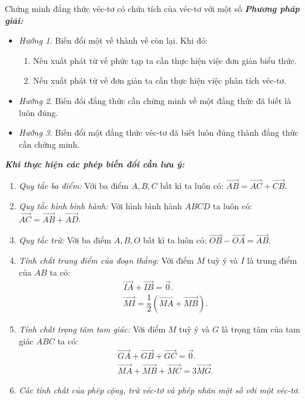 \begin{dang}%
{Chứng minh đẳng thức véc-tơ có chứa tích của véc-tơ với một số}
\textbf{\textit{Phương pháp giải:
}}
\begin{itemize}
\item \textit{Hướng 1.} Biến đổi một vế thành vế còn lại. Khi đó:
\begin{enumerate}[-]
\item Nếu xuất phát từ vế phức tạp ta cần thực hiện việc đơn giản biểu thức.
\item Nếu xuất phát từ vế đơn giản ta cần thực hiện việc phân tích véc-tơ.
\end{enumerate}
\item \textit{Hướng 2.} Biến đổi đẳng thức cần chứng minh về một đẳng thức đã biết là luôn đúng.
\item \textit{Hướng 3.} Biến đổi một đẳng thức véc-tơ đã biết luôn đúng thành đẳng thức cần chứng minh.
\end{itemize}
\textit{\textbf{Khi thực hiện các phép biến đổi cần lưu ý:}}
\begin{enumerate}[-]
\item \textit{Quy tắc ba điểm:} Với ba điểm $A,B,C$ bất kì ta luôn có:
$\vec {AB}=\vec {AC}  +  \vec {CB}$.
\item \textit{Quy tắc hình bình hành:} Với hình bình hành $ABCD$ ta luôn có:
$\vec {AC}=\vec {AB}  +  \vec {A D}$.
\item \textit{Quy tắc trừ:} Với ba điểm $A,B,O$ bất kì ta luôn có:
$\vec {OB}  -  \vec {OA}=\vec {AB}$.
\item \textit{Tính chất trung điểm của đoạn thẳng:} Với điểm $M$ tuỳ ý và $I$ là trung điểm của $AB$ ta có:
\begin{align*}
&\vec {IA}  +  \vec {IB}=\vec {0}. \\
&\vec {MI}=\dfrac{1}{2}\left(\vec {MA}  +  \vec {MB}\right).
\end{align*}
\item \textit{Tính chất trọng tâm tam giác:}  Với điểm $M$ tuỳ ý và $G$ là trọng tâm của tam giác $ABC$ ta có:
\begin{align*}
&\vec {GA}  +  \vec {GB}  +  \vec {GC}=\vec {0}.\\
&\vec {MA}  +  \vec {MB}  +  \vec {MC}=3\vec {MG}.
\end{align*}

\item \textit{Các tính chất của phép cộng, trừ véc-tơ và phép nhân một số với một véc-tơ.}
\end{enumerate}
\end{dang}
